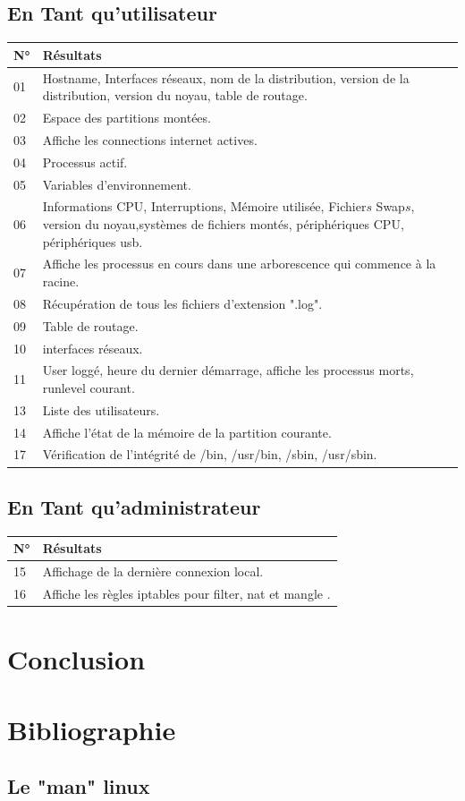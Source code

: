\documentclass[11pt,a4paper,titlepage, oneside]{article}
\begin{document}
	\subsection{{\color{blue}En Tant qu'utilisateur}}
		\begin{tabular}{|l|p{12cm}|}
			\hline
				\textbf{N°}&\textbf{Résultats}\\
			\hline
				01 & Hostname, Interfaces réseaux, nom de la distribution, version de la distribution, version du noyau, table de routage.\\
			\hline
				02 & Espace des partitions montées.\\
			\hline
				03 & Affiche les connections internet actives.\\
			\hline
				04 & Processus actif.\\
			\hline
				05 & Variables d'environnement.\\
			\hline
				06 & Informations CPU, Interruptions, Mémoire utilisée, Fichier\(s\) Swap\(s\), version du noyau,systèmes de fichiers montés, périphériques CPU, périphériques usb.\\
			\hline
				07 & Affiche les processus en cours dans une arborescence qui commence à la racine.\\
			\hline
				08 & Récupération de tous les fichiers d'extension ".log".\\
			\hline
				09 & Table de routage.\\
			\hline
				10 & interfaces réseaux.\\
			\hline
				11 & User loggé, heure du dernier démarrage, affiche les processus morts, runlevel courant.\\
			\hline
				13 & Liste des utilisateurs.\\
			\hline
				14 & Affiche l'état de la mémoire de la partition courante.\\
			\hline
				17 & Vérification de l'intégrité de /bin, /usr/bin, /sbin, /usr/sbin.\\
			\hline
		\end{tabular}
			
	\subsection{{\color{blue}En Tant qu'administrateur}}
		\begin{tabular}{|l|p{12cm}|}
			\hline
			\textbf{N°}&\textbf{Résultats}\\
			\hline
				15 & Affichage de la dernière connexion local.\\
			\hline
				16 & Affiche les règles iptables pour filter, nat et mangle .\\
			\hline
		\end{tabular}
		
\newpage
\section{{\color{red}Conclusion}}
	


\newpage
\section{{\color{red}Bibliographie}}
	\subsection*{\color{blue}Le "man" linux}
\end{document}
